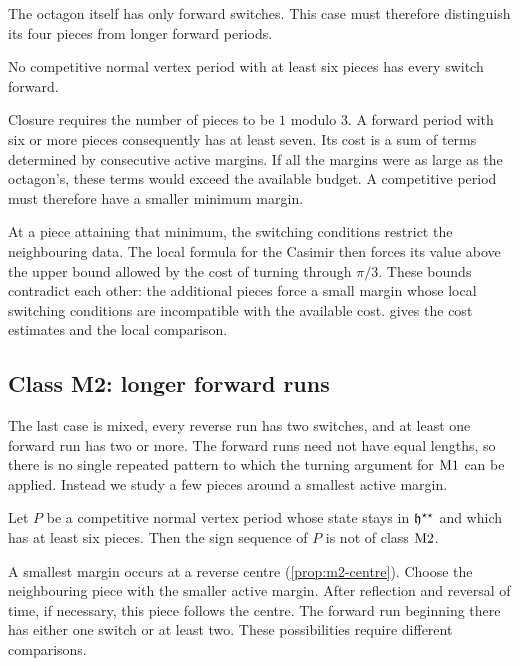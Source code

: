 The octagon itself has only forward switches. This case must therefore distinguish its four
pieces from longer forward periods.

\begin{theorem}[Class F]\label{thm:class-F}
No competitive normal vertex period with at least six pieces has every switch forward.
\end{theorem}

Closure requires the number of pieces to be $1$ modulo $3$. A forward period with six or more
pieces consequently has at least seven. Its cost is a sum of terms determined by consecutive
active margins. If all the margins were as large as the octagon's, these terms would exceed the
available budget. A competitive period must therefore have a smaller minimum margin.

At a piece attaining that minimum, the switching conditions restrict the neighbouring data. The
local formula for the Casimir then forces its value above the upper bound allowed by the cost of
turning through $\pi/3$. These bounds contradict each other: the additional pieces force a small
margin whose local switching conditions are incompatible with the available cost.
 gives the cost estimates and the local comparison.

\subsection{Class M2: longer forward runs}\label{sec:outline-mixed}

The last case is mixed, every reverse run has two switches, and at least one forward run has two
or more. The forward runs need not have equal lengths, so there is no single repeated pattern
to which the turning argument for $\mathrm{M1}$ can be applied. Instead we study a few pieces
around a smallest active margin.

\begin{theorem}\label{thm:class-M2}
Let $P$ be a competitive normal vertex period whose state stays in $\mathfrak{h}^{\star\star}$ and which has at
least six pieces. Then the sign sequence of $P$ is not of class $\mathrm{M2}$.
\end{theorem}

A smallest margin occurs at a reverse centre (\cref{prop:m2-centre}). Choose the neighbouring
piece with the smaller active margin. After reflection and reversal of time, if necessary, this
piece follows the centre. The forward run beginning there has either one switch or at least two.
These possibilities require different comparisons.

